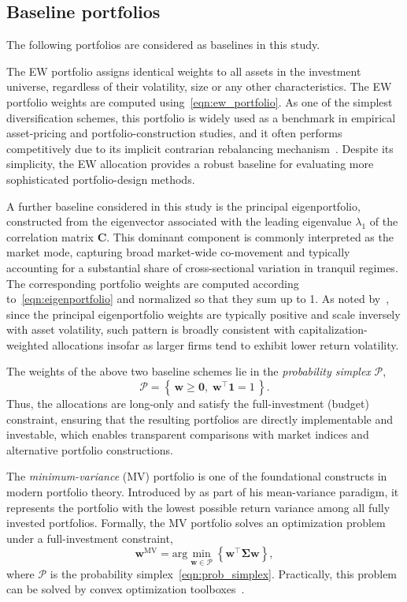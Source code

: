 \documentclass[pdflatex,sn-basic]{sn-jnl}%
\theoremstyle{thmstyleone}%
\theoremstyle{thmstyletwo}%
\theoremstyle{thmstylethree}%
\newcommand{\bw}{\boldsymbol{w}}
\newcommand{\bC}{\boldsymbol{C}}
\newcommand{\bSigma}{\boldsymbol{\Sigma}}
\newcommand{\calP}{\mathcal{P}}
\newcommand{\bone}{\boldsymbol{1}}
\newcommand{\bzero}{\boldsymbol{0}}
\newcommand{\figbrc}[1]{\left\{ #1 \right\} }
\renewcommand{\arg}{\mathrm{arg}}
\begin{document}
\subsection{Baseline portfolios}
\label{sec:baselines}
The following portfolios are considered as baselines in this study.

The EW portfolio assigns identical weights to all assets in the investment universe, regardless of their volatility, size or any other characteristics. The EW portfolio weights are computed using~\eqref{eqn:ew_portfolio}. As one of the simplest diversification schemes, this portfolio is widely used as a benchmark in empirical asset-pricing and portfolio-construction studies, and it often performs competitively due to its implicit contrarian rebalancing mechanism~\citep{demiguel2009optimal}. Despite its simplicity, the EW allocation provides a robust baseline for evaluating more sophisticated portfolio-design methods.

A further baseline considered in this study is the principal eigenportfolio, constructed from the eigenvector associated with the leading eigenvalue $\lambda_1$ of the correlation matrix $\bC$. This dominant component is commonly interpreted as the market mode, capturing broad market-wide co-movement and typically accounting for a substantial share of cross-sectional variation in tranquil regimes. The corresponding portfolio weights are computed according to~\eqref{eqn:eigenportfolio} and normalized so that they sum up to 1. As noted by~\citet{avellaneda2010statistical}, since the principal eigenportfolio weights are typically positive and scale inversely with asset volatility, such pattern is broadly consistent with capitalization-weighted allocations insofar as larger firms tend to exhibit lower return volatility. 

The weights of the above two baseline schemes lie in the \textit{probability simplex} $\calP$,
\begin{equation}
\label{eqn:prob_simplex}
    \calP = \figbrc{\,\bw \ge \bzero,\; \bw^{\top} \bone = 1 \,}.
\end{equation}
Thus, the allocations are long-only and satisfy the full-investment (budget) constraint, ensuring that the resulting portfolios are directly implementable and investable, which enables transparent comparisons with market indices and alternative portfolio constructions.

The \textit{minimum-variance} (MV) portfolio is one of the foundational constructs in modern portfolio theory. Introduced by \citet{markowitz1952portfolio} as part of his mean-variance paradigm, it represents the portfolio with the lowest possible return variance among all fully invested portfolios. Formally, the MV portfolio solves an optimization problem under a full-investment constraint,
\begin{equation}
\label{eqn:mv_portfolio}
    \bw^{\textrm{MV}} = 
    \arg\min_{\bw \in \calP} \figbrc{\bw^\top \bSigma \bw},
\end{equation}
where $\calP$ is the probability simplex~\eqref{eqn:prob_simplex}. Practically, this problem can be solved by convex optimization toolboxes~\citep[see, e.g.,][]{grant2009cvx, mathworks2025quadprog}. 
\end{document}
